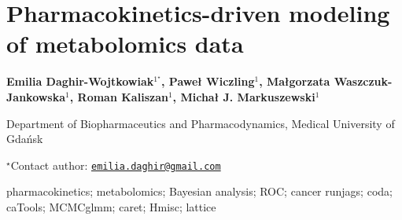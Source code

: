 \documentclass[\main/boa.tex]{subfiles}
\begin{document}
\pagestyle{empty}

\section{Pharmacokinetics-driven modeling of metabolomics data}

\begin{center}
  {\bf Emilia Daghir-Wojtkowiak$^{1^\star}$, Paweł Wiczling$^{1}$, Małgorzata Waszczuk-Jankowska$^{1}$, Roman Kaliszan$^{1}$, Michał J. Markuszewski$^{1}$}
\end{center}

\vskip 0.3cm

\begin{affiliations}
\begin{enumerate}
\begin{minipage}{0.915\textwidth}
\centering
\item Department of Biopharmaceutics and Pharmacodynamics, Medical University
of Gdańsk \\[-2pt]
\end{minipage}
\end{enumerate}
$^\star$Contact author: \href{mailto:emilia.daghir@gmail.com}{\nolinkurl{emilia.daghir@gmail.com}}\\
\end{affiliations}

\vskip 0.5cm

\begin{minipage}{0.915\textwidth}
\keywords pharmacokinetics; metabolomics; Bayesian analysis; ROC; cancer
\packages runjags; coda; caTools; MCMCglmm; caret; Hmisc; lattice
\end{minipage}

\vskip 0.8cm
\end{document}
